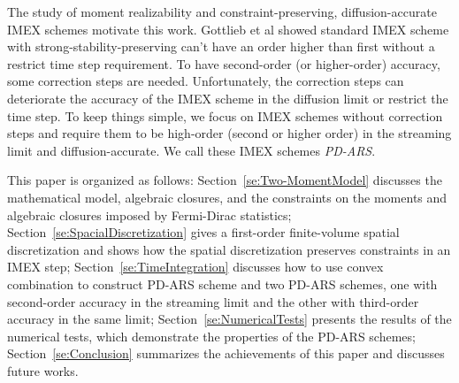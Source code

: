 The study of moment realizability and constraint-preserving, diffusion-accurate IMEX schemes motivate this work.
Gottlieb et al\cite{gottlieb_etal_2001} showed standard IMEX scheme with strong-stability-preserving can't have an order higher than first without a restrict time step requirement.
To have second-order (or higher-order) accuracy, some correction steps are needed.
Unfortunately, the correction steps can deteriorate the accuracy of the IMEX scheme in the diffusion limit or restrict the time step.
To keep things simple, we focus on IMEX schemes without correction steps and require them to be high-order (second or higher order) in the streaming limit and diffusion-accurate.
We call these IMEX schemes \textit{PD-ARS}.

This paper is organized as follows: Section~\ref{se:Two-MomentModel} discusses the mathematical model, algebraic closures, and the constraints on the moments and algebraic closures imposed by Fermi-Dirac statistics;
Section~\ref{se:SpacialDiscretization} gives a first-order finite-volume spatial discretization and shows how the spatial discretization preserves constraints in an IMEX step;
Section~\ref{se:TimeIntegration} discusses how to use convex combination to construct PD-ARS scheme and two PD-ARS schemes, one with second-order accuracy in the streaming limit and the other with third-order accuracy in the same limit;
Section~\ref{se:NumericalTests} presents the results of the numerical tests, which demonstrate the properties of the PD-ARS schemes; Section~\ref{se:Conclusion} summarizes the achievements of this paper and discusses future works.